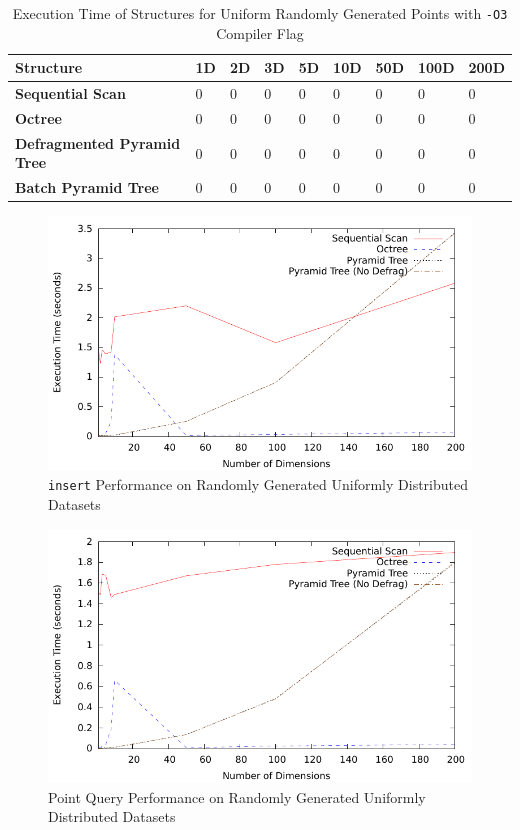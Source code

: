 \begin{table}
	\centering
	\begin{tabular}{|l|l|l|l|l|l|l|l|l|}
		\hline
		\textbf{Structure} & \textbf{1D} & \textbf{2D} & \textbf{3D} & \textbf{5D} & \textbf{10D} & \textbf{50D} & \textbf{100D} & \textbf{200D} \\
		\hline
		\textbf{Sequential Scan} & 0 & 0 & 0 & 0 & 0 & 0 & 0 & 0 \\
		\textbf{Octree} & 0 & 0 & 0 & 0 & 0 & 0 & 0 & 0 \\
		\textbf{Defragmented Pyramid Tree} & 0 & 0 & 0 & 0 & 0 & 0 & 0 & 0 \\
		\textbf{Batch Pyramid Tree} & 0 & 0 & 0 & 0 & 0 & 0 & 0 & 0 \\
		\hline
	\end{tabular}
	\caption{Execution Time of Structures for Uniform Randomly Generated Points with \texttt{-O3} Compiler Flag}
	\label{tab:perf1-randuniform-o3}
\end{table}
\begin{figure}
	\centering
	\includegraphics[scale=0.8]{../results/end_of_iteration1/all_insert_randuniform.pdf}
	\caption{\texttt{insert} Performance on Randomly Generated Uniformly Distributed Datasets}
	\label{fig:perf-1-allinsert}
\end{figure}

\begin{figure}
	\centering
	\includegraphics[scale=0.8]{../results/end_of_iteration1/all_pquery_randuniform.pdf}
	\caption{Point Query Performance on Randomly Generated Uniformly Distributed Datasets}
	\label{fig:perf-1-allpquery}
\end{figure}

